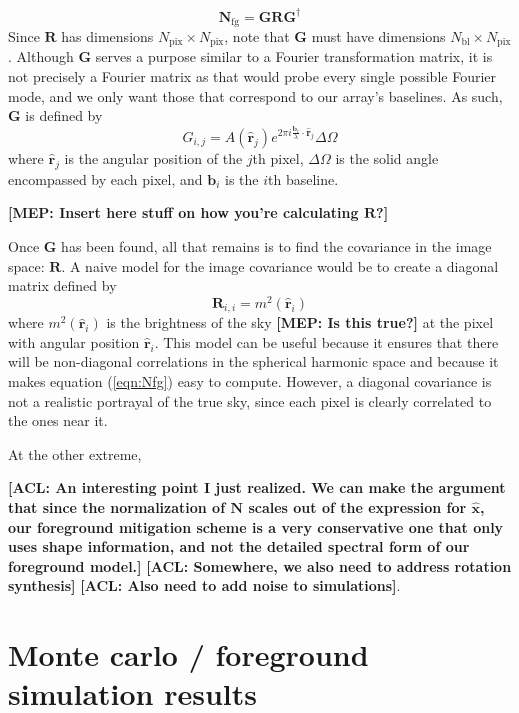 \documentclass[twolcolumn,apj]{emulateapj}
\newcommand{\Nfg}{\mathbf{N}_{\textrm{fg}}}
\newcommand{\R}{\mathbf{R}}
\newcommand{\rhat}{\hat{\mathbf{r}}}
\newcommand{\Nbl}{N_{\textrm{bl}}}
\newcommand{\acl}[1]{{\color{red} \textbf{[ACL:  #1]}}}
\newcommand{\mep}[1]{{\color{applegreen} \textbf{[MEP:  #1]}}}
\begin{document}
\begin{equation}
\Nfg = \mathbf{G} \R \mathbf{G}^\dagger
\label{eqn:Nfg}
\end{equation}
Since $\R$ has dimensions $N_{\textrm{pix}} \times N_{\textrm{pix}}$, note that $\mathbf{G}$ must have dimensions $\Nbl \times N_{\textrm{pix}}$. Although $\mathbf{G}$ serves a purpose similar to a Fourier transformation matrix, it is not precisely a Fourier matrix as that would probe every single possible Fourier mode, and we only want those that correspond to our array's baselines. As such, $\mathbf{G}$ is defined by 
\begin{equation}
G_{i,j} = A(\rhat_j)e^{2\pi i \frac{\mathbf{b_\textit{i}}}{\lambda} \cdot \boldsymbol \rhat_j} \Delta \Omega
\end{equation}
where $\rhat_j$ is the angular position of the $j$th pixel,  $\Delta \Omega$ is the solid angle encompassed by each pixel, and $\mathbf{b_\textit{i}}$ is the $i$th baseline. 

\mep{Insert here stuff on how you're calculating $\R$?}

Once $\mathbf{G}$ has been found, all that remains is to find the covariance in the image space: $\R$. A naive model for the image covariance would be to create a diagonal matrix defined by 
\begin{equation}
\R_{i,i} = m^2(\rhat_i)
\end{equation}
where $m^2(\rhat_i)$ is the brightness of the sky \mep{Is this true?} at the pixel with angular position $\rhat_i$. This model can be useful because it ensures that there will be non-diagonal correlations in the spherical harmonic space and because it makes equation (\ref{eqn:Nfg}) easy to compute. However, a diagonal covariance is not a realistic portrayal of the true sky, since each pixel is clearly correlated to the ones near it. 

At the other extreme, 

\acl{An interesting point I just realized.  We can make the argument that since the normalization of $\mathbf{N}$ scales out of the expression for $\hat{\mathbf{x}}$, our foreground mitigation scheme is a very conservative one that only uses shape information, and not the detailed spectral form of our foreground model.}
\acl{Somewhere, we also need to address rotation synthesis}
\acl{Also need to add noise to simulations}.

\section{Monte carlo / foreground simulation results}
\label{sec:MonteCarlos}
\end{document}

